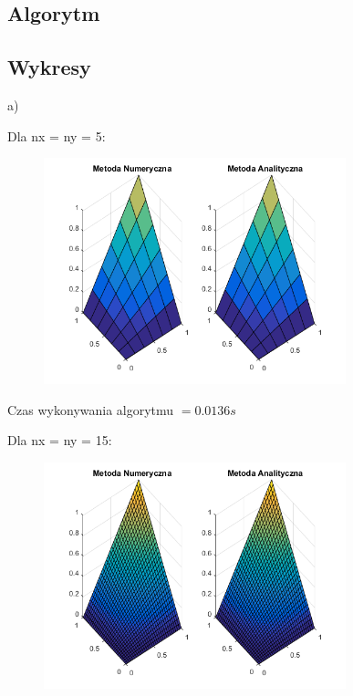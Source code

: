 \subsection{Algorytm}

\begin{samepage}

\end{samepage}

\newpage

\subsection{Wykresy}

a)

Dla nx = ny = 5:

\begin{figure}[!ht]
	\begin{center}
		\includegraphics[width=0.78\textwidth]{Lab5/charts/zad1/5x5.png}
	\end{center}
\end{figure}

Czas wykonywania algorytmu $ = 0.0136 s$

Dla nx = ny = 15:

\begin{figure}[!ht]
	\begin{center}
		\includegraphics[width=0.78\textwidth]{Lab5/charts/zad1/15x15.png}
	\end{center}
\end{figure}

